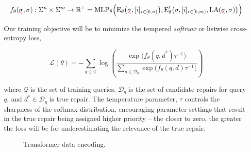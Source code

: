 \documentclass[sigplan,acmsmall,nonacm,screen]{acmart}\settopmatter{printfolios=false,printccs=false,printacmref=false}
\begin{document}
\begin{equation}
f_\theta(\err\sigma, \sigma): \Sigma^n \times \Sigma^m \rightarrow \mathbb{R}^+ = \text{MLP}_{\theta}\Big(\text{E}_\theta\big(\err\sigma, [i]_{i\in [0, n)}\big), \text{E}_\theta'\big(\sigma, [i]_{i \in [0, m)}, \text{LA}(\err\sigma, \sigma)\big)\Big)
\end{equation}

\noindent Our training objective will be to minimize the tempered \textit{softmax} or listwise cross-entropy loss,

\begin{equation}
\mathcal{L}(\theta) = -\sum_{q \in \mathcal{Q}} \log \left( \frac{\exp\big(f_\theta(q, d^*)\tau^{-1}\big)}{\sum_{d \in \mathcal{D}_q} \exp\big(f_\theta(q, d)\tau^{-1}\big)} \right)
\end{equation}

\noindent where $\mathcal{Q}$ is the set of training queries, $\mathcal{D}_q$ is the set of candidate repairs for query $q$, and $d^* \in \mathcal{D}_q$ is true repair. The temperature parameter, $\tau$ controls the sharpness of the softmax distribution, encouraging parameter settings that result in the true repair being assigned higher priority -- the closer to zero, the greater the loss will be for underestimating the relevance of the true repair.

\begin{figure}
\caption{Transformer data encoding.}\label{fig:tx_data_encoding}
\end{figure}
\end{document}
